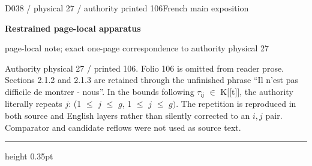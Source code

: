 \documentclass[9pt]{article}
\newcommand{\CanonText}[1]{\par{\fontsize{8.0}{9.35}\selectfont\RaggedRight #1\par}\vspace{2.2pt}}
\newcommand{\LayerTitle}{Restrained page-local apparatus}
\begin{document}
\noindent\begin{minipage}[t][\dimexpr\textheight-5pt\relax][t]{\textwidth}
{\sffamily\fontsize{7.3}{8.2}\selectfont\color{Quiet} D038 / physical 27 / authority printed 106\hfill French main exposition}
\par{}\vspace{4.5pt}
{\sffamily\fontsize{10.4}{11.6}\selectfont\bfseries\color{Accent} \LayerTitle}
\par{\sffamily\fontsize{6.7}{7.7}\selectfont\color{Quiet} page-local note; exact one-page correspondence to authority physical 27}
\vspace{5pt}
\CanonText{Authority physical 27 / printed 106. Folio 106 is omitted from reader prose. Sections 2.1.2 and 2.1.3 are retained through the unfinished phrase “Il n'est pas difficile de montrer - nous”. In the bounds following \(\tau{}_{\mathrm{ij}}\) \(\in{}\) K[[t]], the authority literally repeats \(j\): (1 \(\leq{}\) \(j\) \(\leq{}\) \(g\), 1 \(\leq{}\) \(j\) \(\leq{}\) \(g)\). The repetition is reproduced in both source and English layers rather than silently corrected to an \(i,j\) pair. Comparator and candidate reflows were not used as source text.}
\vfill
{\color{Accent}\hrule height 0.35pt}\vspace{3pt}
\end{minipage}
\newpage
\end{document}
